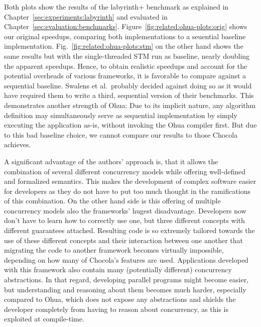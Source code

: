 Both plots show the results of the labyrinth+ benchmark as explained in Chapter~\ref{sec:experiments:labyrinth} and evaluated in Chapter~\ref{sec:evaluation:benchmarks}.
Figure~\ref{fig:related:ohua-plots:orig} shows our original speedups, comparing both implementations to a seuential baseline implementation.
Fig.~\ref{fig:related:ohua-plots:stm} on the other hand shows the same results but with the single-threaded STM run as baseline, nearly doubling the apparent speedups.
Hence, to obtain realistic speedups and account for the potential overheads of various frameworks, it is favorable to compare against a sequential baseline.
Swalens et al.\ probably decided against doing so as it would have required them to write a third, sequential version of their benchmarks.
This demonstrates another strength of Ohua: Due to its implicit nature, any algorithm definition may simultaneously serve as sequential implementation by simply executing the application as-is, without invoking the Ohua compiler first.
But due to this bad baseline choice, we cannot compare our results to those Chocola achieves.

A significant advantage of the authors' approach is, that it allows the combination of several different concurrency models while offering well-defined and formalized semantics.
This makes the development of complex software easier for developers as they do not have to put too much thought in the ramifications of this combination.
On the other hand side is this offering of multiple concurrency models also the frameworks' hugest disadvantage.
Developers now don't have to learn how to correctly use one, but three different concepts with different guarantees attached.
Resulting code is so extremely tailored towards the use of these different concepts and their interaction between one another that migrating the code to another framework becomes virtually impossible, depending on how many of Chocola's features are used.
Applications developed with this framework also contain many (potentially different) concurrency abstractions.
In that regard, developing parallel programs might become easier, but understanding and reasoning about them becomes much harder, especially compared to Ohua, which does not expose any abstractions and shields the developer completely from having to reason about concurrency, as this is exploited at compile-time.

